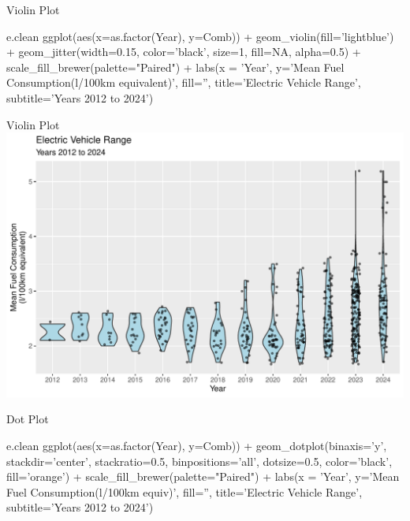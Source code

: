 \documentclass[ignorenonframetext,xcolor=x11names]{beamer}
\begin{document}
\begin{frame}[fragile]{Violin Plot}
\footnotesize
\begin{Rcode}
e.clean %
  ggplot(aes(x=as.factor(Year), y=Comb)) +
    geom_violin(fill='lightblue') +
    geom_jitter(width=0.15, color='black', 
                size=1, fill=NA, alpha=0.5) + 
    scale_fill_brewer(palette="Paired") +
    labs(x = 'Year', 
         y='Mean Fuel Consumption\n(l/100km equivalent)', 
         fill='', 
         title='Electric Vehicle Range', 
         subtitle='Years 2012 to 2024')
\end{Rcode}
\end{frame}

\begin{frame}{Violin Plot}
  \includegraphics[width=\textwidth]{fuel.violin.pdf}
\end{frame}

\begin{frame}[fragile]{Dot Plot}
\footnotesize
\begin{Rcode}
e.clean %
  ggplot(aes(x=as.factor(Year), y=Comb)) +
    geom_dotplot(binaxis='y', 
                 stackdir='center', 
                 stackratio=0.5,
                 binpositions='all',
                 dotsize=0.5, 
                 color='black', 
                 fill='orange') +
    scale_fill_brewer(palette="Paired") +
    labs(x = 'Year', 
         y='Mean Fuel Consumption\n(l/100km equiv)', 
         fill='', 
         title='Electric Vehicle Range', 
         subtitle='Years 2012 to 2024')
\end{Rcode}
\end{frame}
\end{document}
